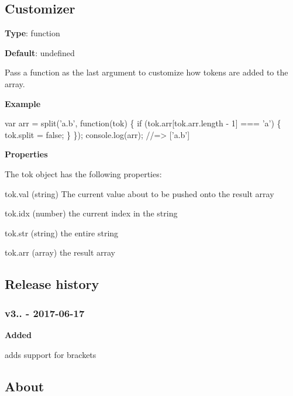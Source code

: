 \subsection*{Customizer}

{\bfseries Type}\+: {\ttfamily function}

{\bfseries Default}\+: {\ttfamily undefined}

Pass a function as the last argument to customize how tokens are added to the array.

{\bfseries Example}


\begin{DoxyCode}
var arr = split('a.b', function(tok) \{
  if (tok.arr[tok.arr.length - 1] === 'a') \{
    tok.split = false;
  \}
\});
console.log(arr);
//=> ['a.b']
\end{DoxyCode}


{\bfseries Properties}

The {\ttfamily tok} object has the following properties\+:


\begin{DoxyItemize}
\item {\ttfamily tok.\+val} (string) The current value about to be pushed onto the result array
\item {\ttfamily tok.\+idx} (number) the current index in the string
\item {\ttfamily tok.\+str} (string) the entire string
\item {\ttfamily tok.\+arr} (array) the result array
\end{DoxyItemize}

\subsection*{Release history}

\subsubsection*{v3.. -\/ 2017-\/06-\/17}

{\bfseries Added}


\begin{DoxyItemize}
\item adds support for brackets
\end{DoxyItemize}

\subsection*{About}

